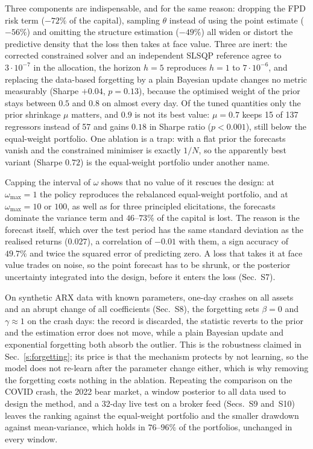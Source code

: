 Three components are indispensable, and for the same reason: dropping the FPD risk term ($-72\%$ of the capital), sampling $\theta$ instead of using the point estimate ($-56\%$) and omitting the structure estimation ($-49\%$) all widen or distort the predictive density that the loss then takes at face value. Three are inert: the corrected constrained solver and an independent SLSQP reference agree to $3\cdot10^{-7}$ in the allocation, the horizon $h=5$ reproduces $h=1$ to $7\cdot10^{-6}$, and replacing the data-based forgetting by a plain Bayesian update changes no metric measurably (Sharpe $+0.04$, $p=0.13$), because the optimised weight of the prior stays between $0.5$ and $0.8$ on almost every day. Of the tuned quantities only the prior shrinkage $\mu$ matters, and $0.9$ is not its best value: $\mu=0.7$ keeps 15 of 137 regressors instead of 57 and gains $0.18$ in Sharpe ratio ($p<0.001$), still below the equal-weight portfolio. One ablation is a trap: with a flat prior the forecasts vanish and the constrained minimiser is exactly $1/N$, so the apparently best variant (Sharpe $0.72$) is the equal-weight portfolio under another name.

Capping the interval of $\omega$ shows that no value of it rescues the design: at $\omega_{\max}=1$ the policy reproduces the rebalanced equal-weight portfolio, and at $\omega_{\max}=10$ or $100$, as well as for three principled elicitations, the forecasts dominate the variance term and $46$--$73\%$ of the capital is lost. The reason is the forecast itself, which over the test period has the same standard deviation as the realised returns ($0.027$), a correlation of $-0.01$ with them, a sign accuracy of $49.7\%$ and twice the squared error of predicting zero. A loss that takes it at face value trades on noise, so the point forecast has to be shrunk, or the posterior uncertainty integrated into the design, before it enters the loss (Sec.~S7).

On synthetic ARX data with known parameters, one-day crashes on all assets and an abrupt change of all coefficients (Sec.~S8), the forgetting sets $\beta=0$ and $\gamma\approx1$ on the crash days: the record is discarded, the statistic reverts to the prior and the estimation error does not move, while a plain Bayesian update and exponential forgetting both absorb the outlier. This is the robustness claimed in Sec.~\ref{s:forgetting}; its price is that the mechanism protects by not learning, so the model does not re-learn after the parameter change either, which is why removing the forgetting costs nothing in the ablation. Repeating the comparison on the COVID crash, the 2022 bear market, a window posterior to all data used to design the method, and a 32-day live test on a broker feed (Secs.~S9 and~S10) leaves the ranking against the equal-weight portfolio and the smaller drawdown against mean-variance, which holds in $76$--$96\%$ of the portfolios, unchanged in every window.
